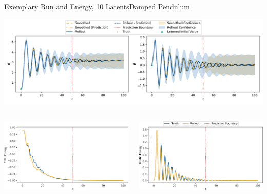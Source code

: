 \documentclass[
	aspectratio=43,
	color={accentcolor=1c},
	logo=false,
	colorframetitle=true,
	handout
]{tudabeamer}
\begin{document}
			\begin{frame}{Exemplary Run and Energy, 10 Latents}{Damped Pendulum}
				\begin{center}
					\includegraphics[width=\linewidth]{figures/experiments/pendulum-damped/rollout-observations-N0.pdf}
				\end{center}
				\vspace{-1cm}
				\begin{columns}
					\begin{column}{0.333\linewidth}
						\begin{center}
							\includegraphics[width=\linewidth]{figures/experiments/pendulum-damped/energy-R110-N0-total.pdf}
						\end{center}
					\end{column}
					\begin{column}{0.333\linewidth}
						\begin{center}
							\includegraphics[width=\linewidth]{figures/experiments/pendulum-damped/energy-R110-N0-kinetic.pdf}

\end{center}
\end{column}
\end{columns}
\end{frame}
\end{document}
